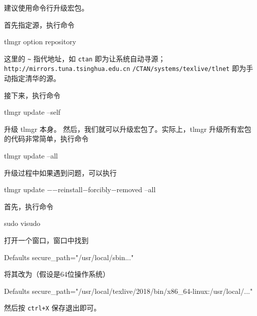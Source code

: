 建议使用命令行升级宏包。

首先指定源，执行命令
\begin{shcode}
  tlmgr option repository ~
\end{shcode}
这里的 \verb|~| 指代地址，如 \verb|ctan| 即为让系统自动寻源；
\verb|http://mirrors.tuna.tsinghua.edu.cn| 
\verb|/CTAN/systems/texlive/tlnet| 即为手动指定清华的源。

接下来，执行命令
\begin{shcode}
  tlmgr update --self
\end{shcode}
升级 tlmgr 本身。 然后，我们就可以升级宏包了。实际上，tlmgr
升级所有宏包的代码非常简单，执行命令
\begin{shcode}
  tlmgr update --all
\end{shcode}
升级过程中如果遇到问题，可以执行
\begin{shcode}
  tlmgr update −−reinstall−forcibly−removed --all
\end{shcode}

%
%
%
%

首先，执行命令
\begin{shcode}
  sudo visudo
\end{shcode}
打开一个窗口，窗口中找到
\begin{shcode}
  Defaults secure_path="/usr/local/sbin..."
\end{shcode}
将其改为（假设是64位操作系统）
\begin{shcode}
  Defaults secure_path="/usr/local/texlive/2018/bin/x86_64-linux:/usr/local/..."
\end{shcode}
然后按 \verb|ctrl+X| 保存退出即可。

